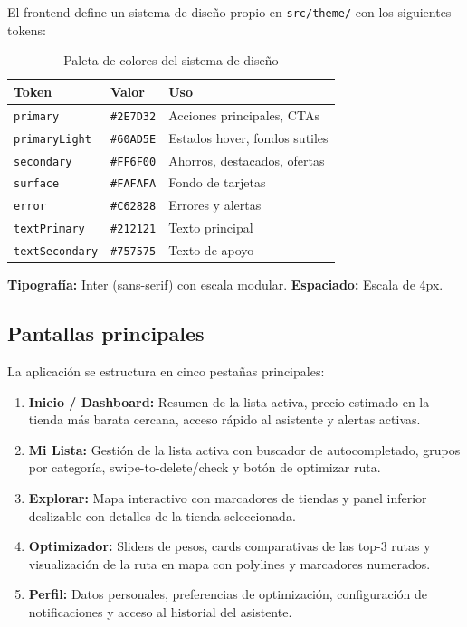 El frontend define un sistema de dise\~no propio en \texttt{src/theme/} con los siguientes
tokens:

\begin{table}[h]
\caption{Paleta de colores del sistema de dise\~no}
\label{tab:colores}
\centering
\begin{tabular}{|l|l|l|}
\hline
\textbf{Token} & \textbf{Valor} & \textbf{Uso} \\
\hline
\texttt{primary} & \texttt{\#2E7D32} & Acciones principales, CTAs \\
\texttt{primaryLight} & \texttt{\#60AD5E} & Estados hover, fondos sutiles \\
\texttt{secondary} & \texttt{\#FF6F00} & Ahorros, destacados, ofertas \\
\texttt{surface} & \texttt{\#FAFAFA} & Fondo de tarjetas \\
\texttt{error} & \texttt{\#C62828} & Errores y alertas \\
\texttt{textPrimary} & \texttt{\#212121} & Texto principal \\
\texttt{textSecondary} & \texttt{\#757575} & Texto de apoyo \\
\hline
\end{tabular}
\end{table}

\textbf{Tipograf\'ia:} Inter (sans-serif) con escala modular. \textbf{Espaciado:} Escala de 4px.

\subsection{Pantallas principales}\label{subsec:pantallas}

La aplicaci\'on se estructura en cinco pesta\~nas principales:

\begin{enumerate}
  \item \textbf{Inicio / Dashboard:} Resumen de la lista activa, precio estimado en la tienda
    m\'as barata cercana, acceso r\'apido al asistente y alertas activas.
  \item \textbf{Mi Lista:} Gesti\'on de la lista activa con buscador de autocompletado, grupos
    por categor\'ia, swipe-to-delete/check y bot\'on de optimizar ruta.
  \item \textbf{Explorar:} Mapa interactivo con marcadores de tiendas y panel inferior
    deslizable con detalles de la tienda seleccionada.
  \item \textbf{Optimizador:} Sliders de pesos, cards comparativas de las top-3 rutas y
    visualizaci\'on de la ruta en mapa con polylines y marcadores numerados.
  \item \textbf{Perfil:} Datos personales, preferencias de optimizaci\'on, configuraci\'on de
    notificaciones y acceso al historial del asistente.
\end{enumerate}

